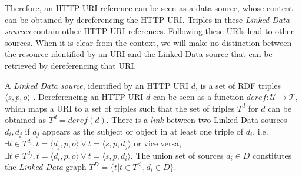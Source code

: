 Therefore, an HTTP URI reference can be seen as a data source, whose
content can be obtained by dereferencing the HTTP URI. Triples in
these \emph{Linked Data sources} contain other HTTP URI
references. Following these URIs lead to other sources. When it is
clear from the context, we will make no distinction between the
resource identified by an URI and the Linked Data source that can be
retrieved by dereferencing that URI.
\begin{definition}
  A \emph{Linked Data source}, identified by an HTTP URI $d$, is a set
  of RDF triples $\langle s,p,o \rangle$ . Dereferencing an HTTP URI
  $d$ can be seen as a function $deref : \mathcal{U} \rightarrow
  \mathcal{T}$, which maps a URI to a set of triples such that the set
  of triples $T^d$ for $d$ can be obtained as $T^d =
  \mathit{deref}(d)$. There is a \emph{link} between two Linked Data
  sources $d_i, d_j$ if $d_j$ appears as the subject or object in at
  least one triple of $d_i$, i.e. $\exists t\in T^{d_i},t=\langle
  d_j,p,o \rangle \vee t=\langle s,p,d_j \rangle$ or vice versa,
  $\exists t\in T^{d_j},t=\langle d_i,p,o \rangle \vee t=\langle
  s,p,d_i \rangle$. The union set of sources $d_i \in D$ constitutes
  the \emph{Linked Data} graph $T^D=\{t| t \in T^{d_i}, d_i \in D\}$.

\end{definition}

